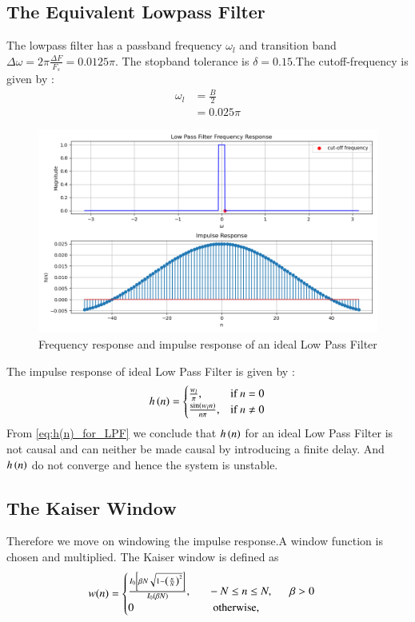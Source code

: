 \documentclass{article}
\begin{document}
\subsection{The Equivalent Lowpass Filter}
The lowpass filter has a passband frequency $\omega_l$ and transition band $\Delta \omega = 2\pi \frac{\Delta F}{F_s} = 0.0125\pi$.
The stopband tolerance is $\delta=0.15$.The cutoff-frequency is given by :
\begin{align}
    \omega_{l} &= \frac{B}{2}\\
                &= 0.025\pi
\end{align}
\begin{figure}[H]
\centering
\includegraphics[width=1\columnwidth]{figs/6.png}
\caption{Frequency response and impulse response of an ideal Low Pass Filter}
\label{fig:LPF_FIR_1}
\end{figure}

The impulse response of ideal Low Pass Filter is given by :
\begin{align}
    h\left(n\right) = 
\begin{cases} 
    \frac{w_l}{\pi}, & \text{if } n = 0 \\
    \frac{\sin(w_l n)}{n\pi}, & \text{if } n \neq 0
\end{cases} \label{eq:h(n)_for_LPF}
\end{align}
From \eqref{eq:h(n)_for_LPF} we conclude that $h\left(n\right)$ for an ideal Low Pass Filter is not causal and can neither be made causal by introducing a finite delay. And $h\left(n\right)$ do not converge and hence the system is unstable.
\subsection{The Kaiser Window}
Therefore we move on windowing the impulse response.A window function is chosen and multiplied. The Kaiser window is defined as
\begin{align}
    w(n) =
    \begin{cases}
    \frac{I_0\left[ \beta N \sqrt{1 - \left(\frac{n}{N}\right)^2} \right]}{I_0(\beta N)},
\indent -N \leq n \leq N, \indent \beta > 0 \nonumber \\
 0 \hspace{2.5 cm} \mbox{otherwise,}
 \end{cases}
\end{align}
\end{document}
